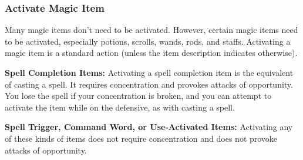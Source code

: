 \subsubsection{Activate Magic Item}
Many magic items don't need to be activated. However, certain magic items need to be activated, especially potions, scrolls, wands, rods, and staffs. Activating a magic item is a standard action (unless the item description indicates otherwise).

\textbf{Spell Completion Items:} Activating a spell completion item is the equivalent of casting a spell. It requires concentration and provokes attacks of opportunity. You lose the spell if your concentration is broken, and you can attempt to activate the item while on the defensive, as with casting a spell.

\textbf{Spell Trigger, Command Word, or Use-Activated Items:} Activating any of these kinds of items does not require concentration and does not provoke attacks of opportunity.